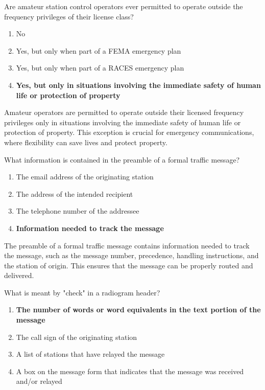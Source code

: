 \begin{tcolorbox}[colback=gray!10!white,colframe=black!75!black,title={T2C09}]
    Are amateur station control operators ever permitted to operate outside the frequency privileges of their license class?
    \begin{enumerate}[label=\Alph*),noitemsep]
        \item No
        \item Yes, but only when part of a FEMA emergency plan
        \item Yes, but only when part of a RACES emergency plan
        \item \textbf{Yes, but only in situations involving the immediate safety of human life or protection of property}
    \end{enumerate}
\end{tcolorbox}

Amateur operators are permitted to operate outside their licensed frequency privileges only in situations involving the immediate safety of human life or protection of property. This exception is crucial for emergency communications, where flexibility can save lives and protect property.


\begin{tcolorbox}[colback=gray!10!white,colframe=black!75!black,title={T2C10}]
    What information is contained in the preamble of a formal traffic message?
    \begin{enumerate}[label=\Alph*),noitemsep]
        \item The email address of the originating station
        \item The address of the intended recipient
        \item The telephone number of the addressee
        \item \textbf{Information needed to track the message}
    \end{enumerate}
\end{tcolorbox}

The preamble of a formal traffic message contains information needed to track the message, such as the message number, precedence, handling instructions, and the station of origin. This ensures that the message can be properly routed and delivered.


\begin{tcolorbox}[colback=gray!10!white,colframe=black!75!black,title={T2C11}]
    What is meant by "check" in a radiogram header?
    \begin{enumerate}[label=\Alph*),noitemsep]
        \item \textbf{The number of words or word equivalents in the text portion of the message}
        \item The call sign of the originating station
        \item A list of stations that have relayed the message
        \item A box on the message form that indicates that the message was received and/or relayed
    \end{enumerate}
\end{tcolorbox}


